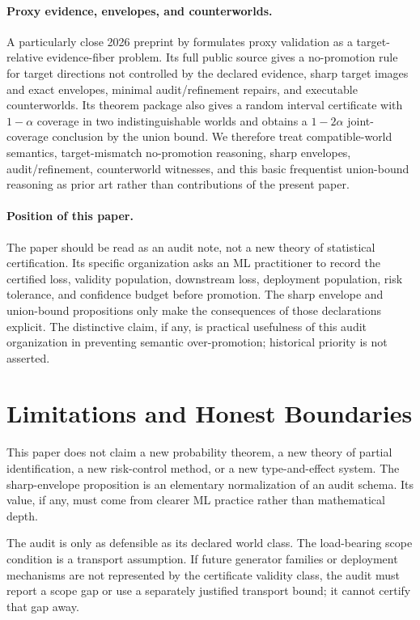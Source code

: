 \documentclass[10pt]{article}
\begin{document}
\paragraph{Proxy evidence, envelopes, and counterworlds.}
A particularly close 2026 preprint by \citet{Zhu2026} formulates proxy
validation as a target-relative evidence-fiber problem.  Its full public
source gives a no-promotion rule for target directions not controlled by the
declared evidence, sharp target images and exact envelopes, minimal
audit/refinement repairs, and executable counterworlds.  Its theorem package
also gives a random interval certificate with \(1-\alpha\) coverage in two
indistinguishable worlds and obtains a \(1-2\alpha\) joint-coverage conclusion
by the union bound.  We therefore treat compatible-world semantics,
target-mismatch no-promotion reasoning, sharp envelopes, audit/refinement,
counterworld witnesses, and this basic frequentist union-bound reasoning as
prior art rather than contributions of the present paper.

\paragraph{Position of this paper.}
The paper should be read as an audit note, not a new theory of statistical
certification.  Its specific organization asks an ML practitioner to record
the certified loss, validity population, downstream loss, deployment
population, risk tolerance, and confidence budget before promotion.  The sharp
envelope and union-bound propositions only make the consequences of those
declarations explicit.  The distinctive claim, if any, is practical usefulness
of this audit organization in preventing semantic over-promotion; historical
priority is not asserted.

\section{Limitations and Honest Boundaries}

This paper does not claim a new probability theorem, a new theory of partial
identification, a new risk-control method, or a new type-and-effect system.
The sharp-envelope proposition is an elementary normalization of an audit
schema.  Its value, if any, must come from clearer ML practice rather than
mathematical depth.

The audit is only as defensible as its declared world class.  The load-bearing
scope condition is a transport assumption.  If future generator families or
deployment mechanisms are not represented by the certificate validity class,
the audit must report a scope gap or use a separately justified transport
bound; it cannot certify that gap away.
\end{document}
